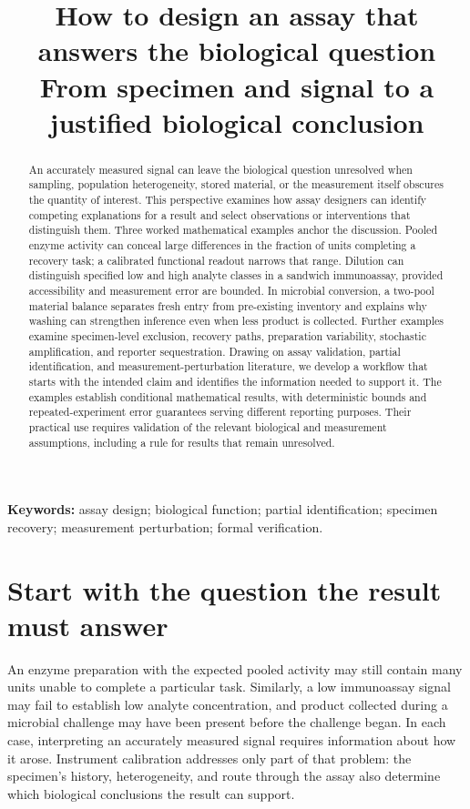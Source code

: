 \documentclass[11pt]{article}
\title{How to design an assay that answers the biological question\\[5pt]
\large From specimen and signal to a justified biological conclusion}
\author{}
\date{}
\begin{document}
\maketitle
\begin{abstract}
An accurately measured signal can leave the biological question unresolved when sampling, population heterogeneity, stored material, or the measurement itself obscures the quantity of interest. This perspective examines how assay designers can identify competing explanations for a result and select observations or interventions that distinguish them. Three worked mathematical examples anchor the discussion. Pooled enzyme activity can conceal large differences in the fraction of units completing a recovery task; a calibrated functional readout narrows that range. Dilution can distinguish specified low and high analyte classes in a sandwich immunoassay, provided accessibility and measurement error are bounded. In microbial conversion, a two-pool material balance separates fresh entry from pre-existing inventory and explains why washing can strengthen inference even when less product is collected. Further examples examine specimen-level exclusion, recovery paths, preparation variability, stochastic amplification, and reporter sequestration. Drawing on assay validation, partial identification, and measurement-perturbation literature, we develop a workflow that starts with the intended claim and identifies the information needed to support it. The examples establish conditional mathematical results, with deterministic bounds and repeated-experiment error guarantees serving different reporting purposes. Their practical use requires validation of the relevant biological and measurement assumptions, including a rule for results that remain unresolved.
\end{abstract}
\noindent\textbf{Keywords:} assay design; biological function; partial identification; specimen recovery; measurement perturbation; formal verification.

\section{Start with the question the result must answer}
An enzyme preparation with the expected pooled activity may still contain many units unable to complete a particular task. Similarly, a low immunoassay signal may fail to establish low analyte concentration, and product collected during a microbial challenge may have been present before the challenge began. In each case, interpreting an accurately measured signal requires information about how it arose. Instrument calibration addresses only part of that problem: the specimen's history, heterogeneity, and route through the assay also determine which biological conclusions the result can support.
\end{document}
